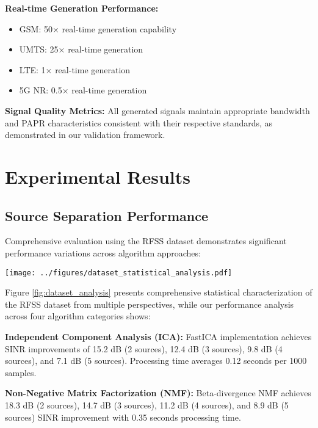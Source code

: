 \documentclass[twocolumn]{article}
\begin{document}
\textbf{Real-time Generation Performance:}
\begin{itemize}
\item GSM: 50× real-time generation capability
\item UMTS: 25× real-time generation
\item LTE: 1× real-time generation  
\item 5G NR: 0.5× real-time generation
\end{itemize}

\textbf{Signal Quality Metrics:}
All generated signals maintain appropriate bandwidth and PAPR characteristics consistent with their respective standards, as demonstrated in our validation framework.

\section{Experimental Results}

\subsection{Source Separation Performance}

Comprehensive evaluation using the RFSS dataset demonstrates significant performance variations across algorithm approaches:

\begin{figure*}[t]
\centering
\texttt{[image: ../figures/dataset\_statistical\_analysis.pdf]}
\caption{Comprehensive statistical characterization of the RFSS dataset showing multi-perspective analysis including PAPR distributions, bandwidth utilization, amplitude characteristics, power spectral density comparisons, signal quality metrics, and dataset composition overview.}
\label{fig:dataset_analysis}
\end{figure*}

Figure \ref{fig:dataset_analysis} presents comprehensive statistical characterization of the RFSS dataset from multiple perspectives, while our performance analysis across four algorithm categories shows:

\textbf{Independent Component Analysis (ICA):} FastICA implementation achieves SINR improvements of 15.2 dB (2 sources), 12.4 dB (3 sources), 9.8 dB (4 sources), and 7.1 dB (5 sources). Processing time averages 0.12 seconds per 1000 samples.

\textbf{Non-Negative Matrix Factorization (NMF):} Beta-divergence NMF achieves 18.3 dB (2 sources), 14.7 dB (3 sources), 11.2 dB (4 sources), and 8.9 dB (5 sources) SINR improvement with 0.35 seconds processing time.
\end{document}

